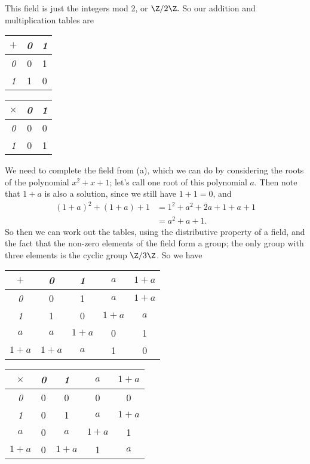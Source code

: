 \documentclass{assignment}
\begin{document}
\begin{qparts}
  \item This field is just the integers mod 2, or $\Z/2\Z.$ So our addition and multiplication tables
    are 
   \begin{center}
    \begin{tabular}{c|c|c}
      $+$ & \emph{0} & \emph{1} \\
      \hline 
      \emph{0} & 0 & 1 \\
      \emph{1} & 1 & 0 \\
    \end{tabular}

    \begin{tabular}{c|c|c}
      $\times$ & \emph{0} & \emph{1} \\
      \hline 
      \emph{0} & 0 & 0 \\
      \emph{1} & 0 & 1 \\
    \end{tabular}
  \end{center}

  \item We need to complete the field from (a), which we can do by considering the roots of the polynomial
    $x^2 + x + 1$; let's call one root of this polynomial $a$. Then note that $1 + a$ is also a solution,
    since we still have $1 + 1 = 0$, and 
    \begin{align*}
      (1 + a)^2 + (1 + a) + 1 &= 1^2 + a^2 + \bar{2}a + 1 + a + 1 \\
                              &= a^2 + a + 1.
    \end{align*}
    So then we can work out the tables, using the distributive property of a field, and the fact that 
    the non-zero elements of the field form a group; the only group with three elements is the cyclic 
    group $\Z/3\Z$. So we have
   \begin{center}
     \begin{tabular}{c|c|c|c|c}
       $+$ & \emph{0} & \emph{1} & \emph{$a$} & \emph{$1+a$} \\
      \hline 
      \emph{0} & 0 & 1 & $a$ & $1+a$ \\
      \emph{1} & 1 & 0 & $1 + a$ & $a$ \\
      \emph{$a$} & $a$ & $1+a$ & 0 & 1 \\
      \emph{$1+a$} & $1+a$ & $a$ & 1 & 0 
    \end{tabular}

    \begin{tabular}{c|c|c|c|c}
      $\times$ & \emph{0} & \emph{1} & \emph{$a$} & \emph{$1+a$} \\
      \hline 
      \emph{0} & 0 & 0 & 0 & 0 \\
      \emph{1} & 0 & 1 & $a$ & $1+a$ \\
      \emph{$a$} & 0 & $a$ & $1+a$ & 1 \\
      \emph{$1+a$} & 0 & $1+a$ & 1 & $a$ 
    \end{tabular}
  \end{center}


\end{qparts}
\end{document}
